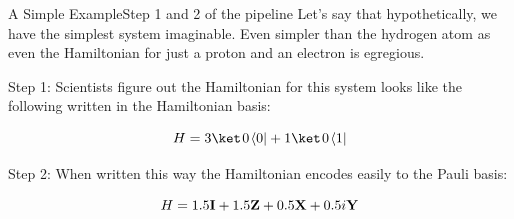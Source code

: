 

    




\begin{frame}{A Simple Example}{Step 1 and 2 of the pipeline}
    Let's say that hypothetically, we have the simplest system imaginable. Even simpler than the hydrogen atom as even the Hamiltonian for just a proton and an electron is egregious. 
    \vspace{2mm}

    Step 1: Scientists figure out the Hamiltonian for this system looks like the following written in the Hamiltonian basis:

    $$ H = 3 \QZero \langle 0 | +  1 \QZero \langle 1 |$$

    Step 2: When written this way the Hamiltonian encodes easily to the Pauli basis:
    \vspace{2mm}

    {%
    $$H = 1.5\mbox{\bfseries{\textrm{I}}} + 1.5\mbox{\bfseries{\textrm{Z}}} + 0.5 \mbox{\bfseries{\textrm{X}}} + 0.5i\mbox{\bfseries{\textrm{Y}}}$$
    }
\end{frame}

